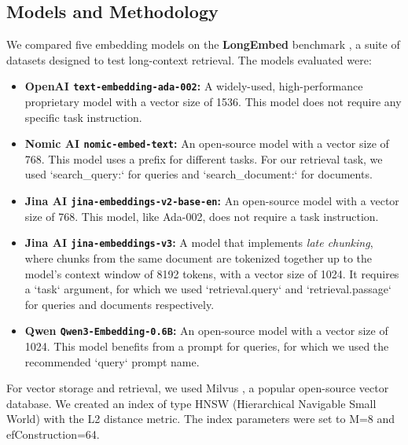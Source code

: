 \subsection{Models and Methodology}
We compared five embedding models on the \textbf{LongEmbed} benchmark \autocite{zhu2024longembedextendingembeddingmodels}, a suite of datasets designed to test long-context retrieval. The models evaluated were:
\begin{itemize}
    \item \textbf{OpenAI \texttt{text-embedding-ada-002}:} A widely-used, high-performance proprietary model with a vector size of 1536. This model does not require any specific task instruction.
    \item \textbf{Nomic AI \texttt{nomic-embed-text}:} An open-source model with a vector size of 768. This model uses a prefix for different tasks. For our retrieval task, we used `search\_query:` for queries and `search\_document:` for documents.
    \item \textbf{Jina AI \texttt{jina-embeddings-v2-base-en}:} An open-source model with a vector size of 768. This model, like Ada-002, does not require a task instruction.
    \item \textbf{Jina AI \texttt{jina-embeddings-v3}:} A model that implements \textit{late chunking}, where chunks from the same document are tokenized together up to the model's context window of 8192 tokens, with a vector size of 1024. It requires a `task` argument, for which we used `retrieval.query` and `retrieval.passage` for queries and documents respectively.
    \item \textbf{Qwen \texttt{Qwen3-Embedding-0.6B}:} An open-source model with a vector size of 1024. This model benefits from a prompt for queries, for which we used the recommended `query` prompt name.
\end{itemize}
For vector storage and retrieval, we used Milvus \autocite{milvus}, a popular open-source vector database. We created an index of type HNSW (Hierarchical Navigable Small World) with the L2 distance metric. The index parameters were set to M=8 and efConstruction=64.

